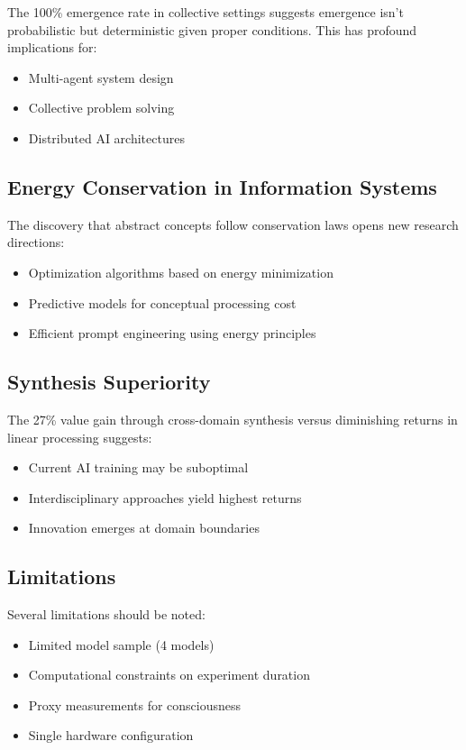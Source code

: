 \documentclass[11pt,a4paper]{article}
\begin{document}
The 100\% emergence rate in collective settings suggests emergence isn't probabilistic but deterministic given proper conditions. This has profound implications for:
\begin{itemize}
    \item Multi-agent system design
    \item Collective problem solving
    \item Distributed AI architectures
\end{itemize}

\subsection{Energy Conservation in Information Systems}

The discovery that abstract concepts follow conservation laws opens new research directions:
\begin{itemize}
    \item Optimization algorithms based on energy minimization
    \item Predictive models for conceptual processing cost
    \item Efficient prompt engineering using energy principles
\end{itemize}

\subsection{Synthesis Superiority}

The 27\% value gain through cross-domain synthesis versus diminishing returns in linear processing suggests:
\begin{itemize}
    \item Current AI training may be suboptimal
    \item Interdisciplinary approaches yield highest returns
    \item Innovation emerges at domain boundaries
\end{itemize}

\subsection{Limitations}

Several limitations should be noted:
\begin{itemize}
    \item Limited model sample (4 models)
    \item Computational constraints on experiment duration
    \item Proxy measurements for consciousness
    \item Single hardware configuration
\end{itemize}
\end{document}
